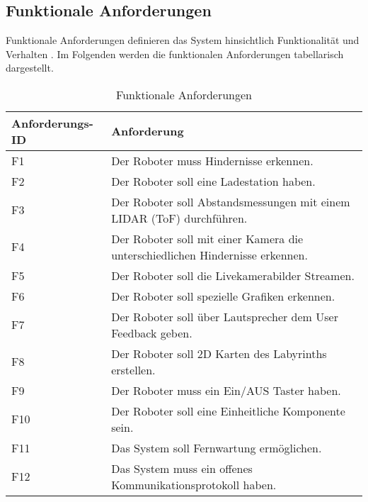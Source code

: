 \subsection{Funktionale Anforderungen}
Funktionale Anforderungen definieren das System hinsichtlich Funktionalität und Verhalten \cite[S.37]{Anforderungsmanagemet.2014}. Im Folgenden werden die funktionalen Anforderungen tabellarisch dargestellt.  
\begin{table}[H]
\begin{tabularx}{\linewidth}{|l|X|}
\hline
\rowcolor{lightgray}
\textbf{Anforderungs-ID} & \textbf{Anforderung}                                                                   \\ \hline
F1              & Der Roboter muss Hindernisse erkennen.                                        \\ \hline
F2              & Der Roboter soll eine Ladestation haben.                                      \\ \hline
F3              & Der Roboter soll Abstandsmessungen mit einem LIDAR (ToF) durchführen.         \\ \hline
F4              & Der Roboter soll mit einer Kamera die unterschiedlichen Hindernisse erkennen. \\ \hline
F5              & Der Roboter soll die Livekamerabilder Streamen.                               \\ \hline
F6              & Der Roboter soll spezielle Grafiken erkennen.                                 \\ \hline
F7              & Der Roboter soll über Lautsprecher dem User Feedback geben.                   \\ \hline
F8              & Der Roboter soll 2D Karten des Labyrinths erstellen.                          \\ \hline
F9              & Der Roboter muss ein Ein/AUS Taster haben.                                    \\ \hline
F10             & Der Roboter soll eine Einheitliche Komponente sein.                           \\ \hline
F11             & Das System soll Fernwartung ermöglichen.                                      \\ \hline
F12             & Das System muss ein offenes Kommunikationsprotokoll haben.                    \\ \hline
\end{tabularx}
    \caption{Funktionale Anforderungen }
    \label{tab:funktionaleAnforderungen}
\end{table}


